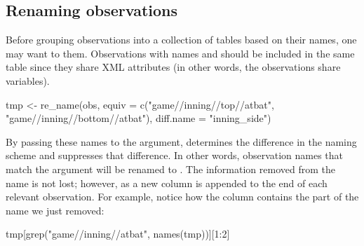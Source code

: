 \begin{article}
\subsection{Renaming observations}

Before grouping observations into a collection of tables based on
their names, one may want to  them. Observations with names
 and
 should be included in the same table
since they share XML attributes (in other words, the observations
share variables).
%
\begin{Schunk}
\begin{Sinput}
tmp <- re_name(obs, equiv = c("game//inning//top//atbat", 
  "game//inning//bottom//atbat"), diff.name = "inning_side") 
\end{Sinput}
\end{Schunk}
%
By passing these names to the  argument, 
determines the difference in the naming scheme and suppresses that
difference. In other words, observation names that match the 
argument will be renamed to . The information
removed from the name is not lost; however, as a new column is appended
to the end of each relevant observation. For example, notice how the
 column contains the part of the name we just
removed:
%
\begin{Schunk}
\begin{Sinput}
tmp[grep("game//inning//atbat", names(tmp))][1:2]
\end{Sinput}
\end{Schunk}
\end{article}
